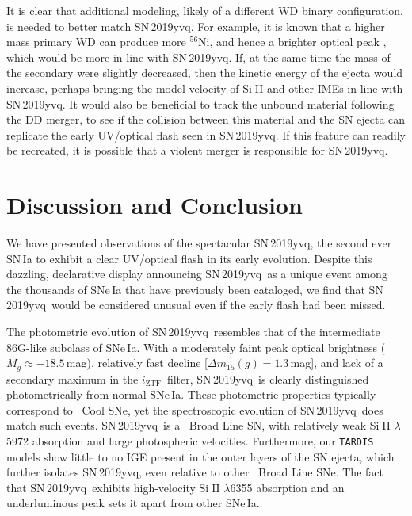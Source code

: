 \documentclass[twocolumn]{aastex63}
\def\ion#1#2{#1$\;${\footnotesize\rm{#2}}\relax}
\newcommand{\aam}[1]{{\color{DarkOrange} aam: \textbf{#1}}}
\newcommand{\iztf}{$i_\mathrm{ZTF}$}
\newcommand{\radni}{$^{56}$Ni}
\newcommand{\sn}{SN\,2019yvq}
\begin{document}
It is clear that additional modeling, likely of a different WD binary
configuration, is needed to better match \sn. For example, it is known that a
higher mass primary WD can produce more \radni, and hence a brighter optical
peak \citep[e.g.,][]{Pakmor12}, which would be more in line with \sn. If, at
the same time the mass of the secondary were slightly decreased, then the
kinetic energy of the ejecta would increase, perhaps bringing the model
velocity of \ion{Si}{II} and other IMEs in line with \sn. It would also be
beneficial to track the unbound material following the DD merger, to see if
the collision between this material and the SN ejecta can replicate the early
UV/optical flash seen in \sn. If this feature can readily be recreated, it is
possible that a violent merger is responsible for \sn.

%
%

\section{Discussion and Conclusion}\label{sec:conclusions}

We have presented observations of the spectacular \sn, the second ever SN\,Ia
to exhibit a clear UV/optical flash in its early evolution. Despite this
dazzling, declarative display announcing \sn\ as a unique event among the
thousands of SNe\,Ia that have previously been cataloged, we find that \sn\
would be considered unusual even if the early flash had been missed.

The photometric evolution of \sn\ resembles that of the intermediate 86G-like
subclass of SNe\,Ia. With a moderately faint peak optical brightness ($M_g
\approx -18.5$\,mag), relatively fast decline [$\Delta m_{15}(g) = 1.3$\,mag],
and lack of a secondary maximum in the \iztf\ filter, \sn\ is clearly
distinguished photometrically from normal SNe\,Ia. These photometric
properties typically correspond to \citeauthor{Branch06}\ Cool SNe, yet the
spectroscopic evolution of \sn\ does match such events. \sn\ is a
\citeauthor{Branch06}\ Broad Line SN, with relatively weak \ion{Si}{II}
$\lambda$5972 absorption and large photospheric velocities. Furthermore, our
\texttt{TARDIS} models show little to no IGE present in the outer layers of
the SN ejecta, which further isolates \sn, even relative to other
\citeauthor{Branch06}\ Broad Line SNe. The fact that \sn\ exhibits
high-velocity \ion{Si}{II} $\lambda$6355 absorption and an underluminous peak
sets it apart from other SNe\,Ia.
\end{document}
